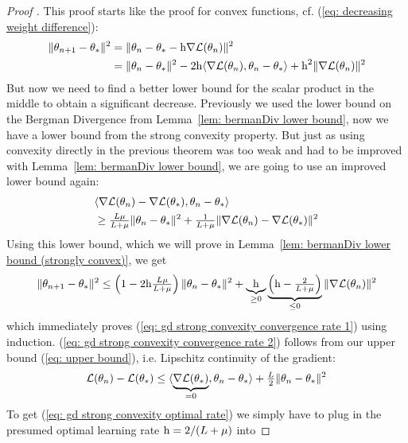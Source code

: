 \begin{proof}[Proof {\parencite[Theorem 2.1.15]{nesterovLecturesConvexOptimization2018}}]
	This proof starts like the proof for convex functions, cf. (\ref{eq:
	decreasing weight difference}):
 \begin{align*}
		\|\theta_{n+1} - \theta_*\|^2
		&= \| \theta_n -\theta_* - \text{h}\nabla\mathcal{L}(\theta_n)\|^2\\
		&= \| \theta_n - \theta_*\|^2
		- 2\text{h}\langle \nabla\mathcal{L}(\theta_n), \theta_n - \theta_*\rangle
		+ \text{h}^2 \| \nabla\mathcal{L}(\theta_n)\|^2
	\end{align*}
	But now we need to find a better lower bound for the scalar product in the
	middle to obtain a significant decrease. Previously we used the lower bound
	on the Bergman Divergence from Lemma~\ref{lem: bermanDiv lower bound}, now
	we have a lower bound from the strong convexity property. But just as using
	convexity directly in the previous theorem was too weak and had to be
	improved with Lemma~\ref{lem: bermanDiv lower bound}, we are going to use
	an improved lower bound again:
 	\begin{align*}
		&\langle \nabla\mathcal{L}(\theta_n) -\nabla\mathcal{L}(\theta_*), \theta_n - \theta_*\rangle	\\
		&\ge \tfrac{L\mu}{L+\mu}\|\theta_n - \theta_*\|^2
		+ \tfrac{1}{L+\mu}
		\|\nabla\mathcal{L}(\theta_n) - \nabla\mathcal{L}(\theta_*)\|^2
	\end{align*}
	Using this lower bound, which we will prove in Lemma~\ref{lem: bermanDiv
	lower bound (strongly convex)}, we get
 \begin{align*}
		\|\theta_{n+1} - \theta_*\|^2
		\le \left(1- 2\text{h} \tfrac{L\mu}{L+\mu}\right)
		\|\theta_n - \theta_*\|^2
		+ \underbrace{\text{h}}_{\ge 0}
		\underbrace{\left(\text{h}-\tfrac{2}{L+\mu}\right)}_{\le0}
		\|\nabla\mathcal{L}(\theta_n)\|^2
	\end{align*}
	which immediately proves (\ref{eq: gd strong convexity convergence rate
	1}) using induction. (\ref{eq: gd strong convexity convergence rate 2}) follows from our
	upper bound (\ref{eq: upper bound}), i.e. Lipschitz continuity of the gradient:
	\begin{align*}
		\mathcal{L}(\theta_n) - \mathcal{L}(\theta_*)
		\le \langle \underbrace{\nabla\mathcal{L}(\theta_*)}_{=0}, \theta_n - \theta_*\rangle
		+ \tfrac{L}{2} \| \theta_n - \theta_*\|^2
	\end{align*}
	To get (\ref{eq: gd strong convexity optimal rate}) we simply have to plug
	in the presumed optimal learning rate \(\text{h}=2/(L+\mu)\) into

\end{proof}
